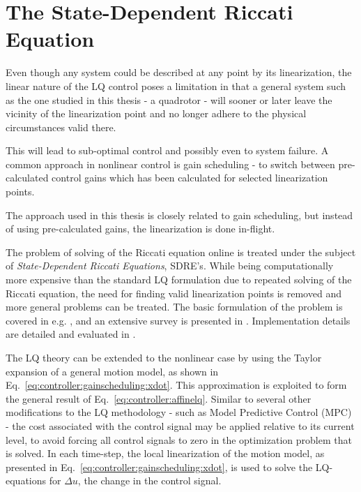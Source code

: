 \section{The State-Dependent Riccati Equation}%
\label{sec:controller:gainscheduling}
    Even though any system could be described at any point by its linearization,
    the linear nature of the LQ control poses a limitation in that
    a general system such as the one studied in this thesis - a quadrotor - will
    sooner or later leave the vicinity of the linearization point and no
    longer adhere to the physical circumstances valid there.

    This will lead to sub-optimal control and possibly even to system failure.
    A common approach in nonlinear control is gain scheduling - to switch
    between pre-calculated control gains which has been calculated for
    selected linearization points.

    The approach used in this thesis is closely related to gain scheduling,
    but instead of using pre-calculated gains, the linearization is done
    in-flight.

    The problem of solving of the Riccati equation  online is treated under
    the subject of \textit{State-Dependent Riccati Equations}, SDRE's.
    While being computationally more expensive than the standard LQ formulation
    due to repeated solving of the Riccati equation, the need
    for finding valid linearization points is removed and more general problems can be treated.
    The basic formulation of the problem is covered in e.g. \citep{Rantzer99piecewiselinear},
    and an extensive survey is presented in \citep{Tayfun08sdresurvey}.
    Implementation details are detailed and evaluated in \citep{Erdem_analysisand,Benner98acceleratingnewton's,10.1109/MED.2006.328740}.

    The LQ theory can be extended to the nonlinear case by using the Taylor
    expansion of a general motion model, as shown in Eq.~\eqref{eq:controller:gainscheduling:xdot}.
    This approximation is exploited to form the general
    result of Eq.~\eqref{eq:controller:affinelq}.
    Similar to several other modifications to the LQ methodology - such as
    Model Predictive Control (MPC) - the cost associated with the control signal
    may be applied relative to its current level, to avoid
    forcing all control signals to zero in the optimization problem that is solved.
    In each time-step, the local linearization of the motion model, as presented in
    Eq.~\eqref{eq:controller:gainscheduling:xdot}, is used to solve the LQ-equations
    for $\Delta u$, the change in the control signal.

